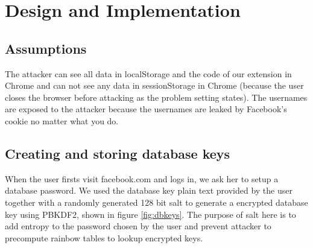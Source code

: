 
\usepackage{graphicx,amssymb,amsmath,enumerate}
\usepackage{courier}
\usepackage{color}
\usepackage{listings}
\usepackage{fancyvrb}
\usepackage{stmaryrd}

\oddsidemargin 0in
\evensidemargin 0in
\textwidth 6.5in
\topmargin -0.5in
\textheight 9.0in




\pagestyle{myheadings}  %


\section{Design and Implementation}
\subsection{Assumptions}
The attacker can see all data in localStorage and the code of our extension in Chrome and can not see any data in sessionStorage in Chrome (because the user closes the browser before attacking as the problem setting states).
The usernames are exposed to the attacker because the usernames are leaked by Facebook's cookie no matter what you do. 

\subsection{Creating and storing database keys}

When the user firsts visit facebook.com and logs in, we ask her to setup a database password. We used the database key plain text provided by the user together with a randomly generated 128 bit salt to generate a encrypted database key using PBKDF2, shown in figure \ref{fig:dbkeys}. The purpose of salt here is to add entropy to the password chosen by the user and prevent attacker to precompute rainbow tables to lookup encrypted keys. 

